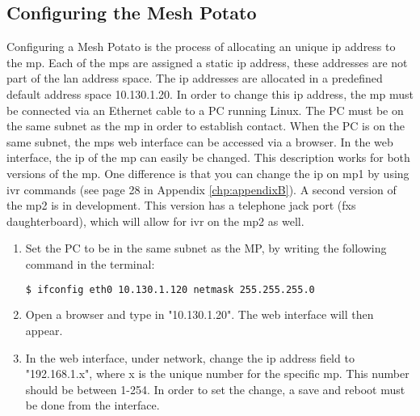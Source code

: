 \subsection{Configuring the Mesh Potato}
\label{subsec:configuring}
Configuring a Mesh Potato is the process of allocating an unique \gls{ip} address to the \gls{mp}. Each of the \glspl{mp} are assigned a static \gls{ip} address, these addresses are not part of the \gls{lan} address space. The \gls{ip} addresses are allocated in a predefined default address space 10.130.1.20. In order to change this \gls{ip} address, the \gls{mp} must be connected via an Ethernet cable to a PC running Linux. The PC must be on the same subnet as the \gls{mp} in order to establish contact. When the PC is on the same subnet, the \glspl{mp} web interface can be accessed via a browser. In the web interface, the \gls{ip} of the \gls{mp} can easily be changed. This description works for both versions of the \gls{mp}. One difference is that you can change the \gls{ip} on \gls{mp1} by using \gls{ivr} commands (see page 28 in Appendix \ref{chp:appendixB}). A second version of the \gls{mp2} is in development. This version has a telephone jack port (\gls{fxs} daughterboard), which will allow for \gls{ivr} on the \gls{mp2} as well. 

\begin{enumerate}
\item Set the PC to be in the same subnet as the MP, by writing the following command in the terminal:
\noindent
\begin{lstlisting}[language=bash]
  $ ifconfig eth0 10.130.1.120 netmask 255.255.255.0
\end{lstlisting}
\item Open a browser and type in "10.130.1.20". The web interface will then appear. 
\item In the web interface, under network, change the \gls{ip} address field to "192.168.1.x", where x is the unique number for the specific \gls{mp}. This number should be between 1-254. In order to set the change, a save and reboot must be done from the interface. 
\end{enumerate}

